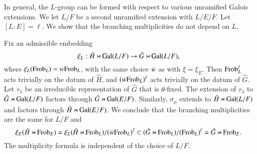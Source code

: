 In general, the $L$-group can be formed with respect to various
unramified Galois extensions.
We let $L/F$ be a second unramified extension with $L/E/F$.  Let
$[L:E]=\ell$.  We show that the  branching multiplicities
do not depend on $L$.

Fix an admissible embedding
\[
\xi_L:\hat H \rtimes {\operatorname{Gal}}(L/F)\to \hat G \rtimes {\operatorname{Gal}}(L/F),
\]
where $\xi_L({\operatorname{Frob}}_L) = \dot w {\operatorname{Frob}}_L$, with the same choice $\dot w $
as with $\xi = \xi_E$.  Then ${\operatorname{Frob}}_L^\ell$ acts trivially on the
datum of $\hat H$, and $(\dot w {\operatorname{Frob}}_L)^\ell$ acts trivially on the
datum of $\hat G$.  Let $\tau_\lambda$ be an irreducible
representation of $\hat G$ that is $\theta$-fixed.  The extension of
$\tau_\lambda$ to $\hat G\rtimes {\operatorname{Gal}}(L/F)$ factors through $\hat
G\rtimes {\operatorname{Gal}}(E/F)$.  Similarly, $\sigma_\mu$ extends to $\hat
H\rtimes {\operatorname{Gal}}(L/F)$ and factors through $\hat
H\rtimes{\operatorname{Gal}}(E/F)$.  We conclude that the branching multiplicities
are the same for $L/F$ and
\[
\xi_E(\hat H \rtimes {\operatorname{Frob}}_E) 
= \xi_L(\hat H\rtimes {\operatorname{Frob}}_L)/(\dot w {\operatorname{Frob}}_L)^\ell 
\subset (\hat G\rtimes {\operatorname{Frob}}_L)/( {\operatorname{Frob}}_L)^\ell 
= \hat G\rtimes {\operatorname{Frob}}_E.
\]
The multiplicity formula is independent of the choice of $L/F$.

